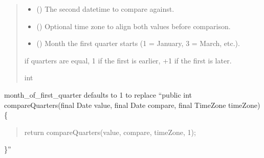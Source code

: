 \documentclass[letterpaper,10pt,english]{sphinxmanual}
\begin{document}
\begin{fulllineitems}
\begin{fulllineitems}
\begin{quote}
\begin{description}
\begin{itemize}
\item {} 
\sphinxAtStartPar
{} () \textendash{} The second datetime to compare against.

\item {} 
\sphinxAtStartPar
{} (\sphinxstyleliteralemphasis{\sphinxupquote{{[}}}\sphinxstyleliteralemphasis{\sphinxupquote{{]}}}) \textendash{} Optional time zone to align both values before comparison.

\item {} 
\sphinxAtStartPar
{} () \textendash{} Month the first quarter starts (1 = January, 3 = March, etc.).

\end{itemize}

 if quarters are equal,
\sphinxhyphen{}1 if the first is earlier,
+1 if the first is later.

\sphinxAtStartPar
int

\end{description}\end{quote}
\begin{description}
\sphinxAtStartPar
month\_of\_first\_quarter defaults to 1 to replace
“public int compareQuarters(final Date value, final Date compare, final TimeZone timeZone) \{
\begin{quote}

\sphinxAtStartPar
return compareQuarters(value, compare, timeZone, 1);
\end{quote}

\sphinxAtStartPar
\}”

\end{description}

\end{fulllineitems}



\end{fulllineitems}
\end{document}
